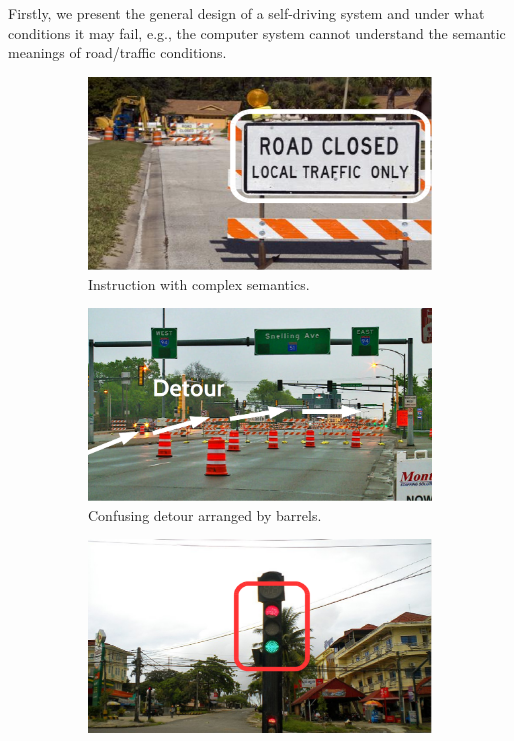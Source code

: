 
Firstly, we present the general design of a self-driving system and
under what conditions it may fail, e.g., the computer system cannot 
understand the semantic meanings of road/traffic conditions. 


\begin{figure}[ht]
\centering
  \begin{subfigure}[t]{0.33\textwidth}
    \includegraphics[width=\linewidth]{Figs/RTDrive/motivation/local_traffic.jpeg}
    \vspace{-0.2cm}
    \caption{Instruction with complex semantics.}
    \label{motivation:local_traffic}
  \end{subfigure}%
 \begin{subfigure}[t]{0.33\textwidth}
    \includegraphics[width=\linewidth]{Figs/RTDrive/motivation/detour.jpg}
    \vspace{-0.2cm}
    \caption{Confusing detour arranged by barrels.}
    \label{motivation:detour}
  \end{subfigure}%
  \begin{subfigure}[t]{0.33\textwidth}
    \includegraphics[width=\linewidth]{Figs/RTDrive/motivation/malfunctioning_traffic_light.jpg}

\end{subfigure}
\end{figure}
